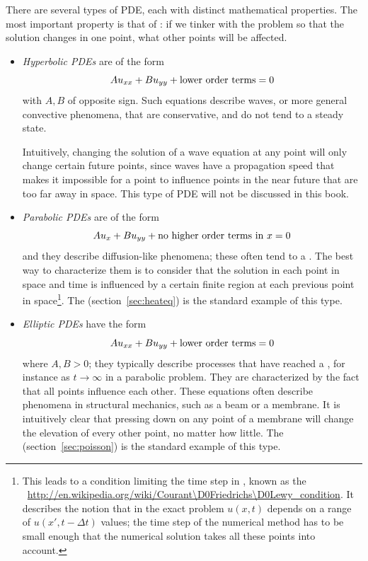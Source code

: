 There are several types of \ac{PDE}, each with distinct mathematical
properties. The most important property is that of : if we tinker with the problem so that the solution
changes in one point, what other points will be affected.
\begin{itemize}
\item \emph{Hyperbolic \acp{PDE}} are of the form
\[ Au_{xx}+Bu_{yy}+\hbox{lower order terms} =0 \]
with $A,B$ of opposite sign. Such equations describe waves,
or more general convective phenomena, that are conservative,
and do not tend to a steady state.

Intuitively, changing the solution of a wave equation at any point
will only change certain future points, since waves have a propagation
speed that makes it impossible for a point to influence points in the
near future that are too far away in space. This type of \ac{PDE} will
not be discussed in this book.
\item \emph{Parabolic \acp{PDE}} are of the form
\[ Au_x+Bu_{yy}+\hbox{no higher order terms in $x$}=0 \]
and they describe diffusion-like phenomena; these often tend to a
. The best way to
characterize them is to consider that the solution in each point in
space and time is influenced by a certain finite region at each
previous point in space\footnote{This leads to a condition limiting
  the time step in , known as the
  ~\url{http://en.wikipedia.org/wiki/Courant\D0Friedrichs\D0Lewy_condition}.
  It describes the notion that in the exact problem $u(x,t)$ depends
  on a range of $u(x',t-\Delta t)$ values; the time step of the
  numerical method has to be small enough that the numerical solution
  takes all these points into account.}. The 
(section~\ref{sec:heateq}) is the standard example of this type.
\item \emph{Elliptic \acp{PDE}} have the form 
\[ Au_{xx}+Bu_{yy}+\hbox{lower order terms} =0 \]
where $A,B>0$; they typically describe processes that have reached a
, for instance as $t\rightarrow\infty$ in a parabolic
problem. They are characterized by the fact that all points influence
each other. These equations often describe phenomena in structural
mechanics, such as a beam or a membrane. It is intuitively clear that
pressing down on any point of a membrane will change the elevation of
every other point, no matter how little. The  (section~\ref{sec:poisson}) is the standard example of
this type.
\end{itemize}

